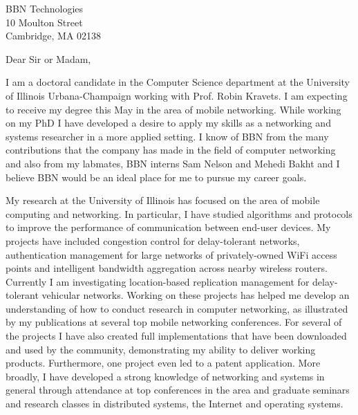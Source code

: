 \documentclass{letter}
\begin{document}
\address{Nathanael Thompson\\812 Breen Drive\\Champaign, IL 61820\\nathomps@cs.uiuc.edu\\(469)
230-7125 (Mobile)}
\signature{Nathanael Thompson}
\begin{letter}{BBN Technologies\\10 Moulton Street\\Cambridge, MA 02138}

\opening{Dear Sir or Madam,}
I am a doctoral candidate in the Computer Science department at the
University of Illinois Urbana-Champaign working with Prof. Robin Kravets.  I
am expecting to receive my degree this May in the area of mobile networking.  
While working on my PhD I have developed
a desire to apply my skills as a networking and systems
researcher in a more applied setting. 
I know of BBN from the many contributions that the company has made in the
field of computer networking 
and also from my labmates, BBN interns Sam Nelson and Mehedi
Bakht and I believe BBN would be an ideal place for me to pursue
my career goals.

My research at the University of Illinois has focused on the area of mobile
computing and networking.  In particular, I have studied algorithms and
protocols to improve the performance of communication between end-user
devices.  My projects have included congestion control for delay-tolerant
networks, authentication management for large networks of privately-owned WiFi
access points and intelligent bandwidth aggregation across nearby wireless
routers.  Currently I am investigating location-based replication management for
delay-tolerant vehicular networks.  Working on these projects has helped me
develop an understanding of how to conduct research in computer
networking, as illustrated by my publications 
at several top mobile networking conferences.  
For several of the projects I have also created
full implementations
that have been downloaded and used by the community, demonstrating my
ability to deliver working products.  Furthermore, one project
even led to a patent application.
More broadly, I have 
developed a strong knowledge of networking and systems in general
through attendance at top conferences in the area and
graduate seminars and research classes in
distributed systems, the Internet and operating systems.  


\end{letter}
\end{document}
